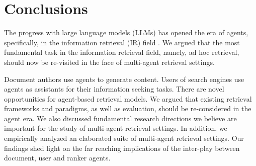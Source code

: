 \section{Conclusions}
The progress with large language models (LLMs) has opened the era of agents, specifically, in the information retrieval (IR) field \cite{Chen+al:21a,Shah+White:24a,White:25a,Zhai:24a,Zhang+al:24a}. We argued that the most fundamental task in the information retrieval field, namely, ad hoc retrieval, should now be re-visited in the face of multi-agent retrieval settings.

Document authors use agents to generate content. Users of search engines use agents as assistants for their information seeking tasks. There are novel opportunities for agent-based retrieval models. We argued that existing retrieval frameworks and paradigms, as well as evaluation, should be re-considered in the agent era. We also discussed fundamental research directions we believe are important for the study of multi-agent retrieval settings. In addition, we empirically analyzed an elaborated suite of multi-agent retrieval settings. Our findings shed light on the far reaching implications of the inter-play between document, user and ranker agents.


